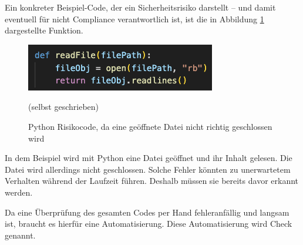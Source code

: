 \documentclass[../main.tex]{subfiles}
\begin{document}
Ein konkreter Beispiel-Code, der ein Sicherheitsrisiko darstellt -- und damit eventuell für nicht Compliance verantwortlich ist, ist die in Abbildung \ref{fig:codecompliance} dargestellte Funktion.

\begin{figure}[ht]
    \centering
    \includegraphics[scale=1]{bilder/CodeScreenShot.png}
    \caption{Python Risikocode, da eine geöffnete Datei nicht richtig geschlossen wird}
    \footnotesize (selbst geschrieben)
    \label{fig:codecompliance}
\end{figure}

In dem Beispiel wird mit Python eine Datei geöffnet und ihr Inhalt gelesen.
Die Datei wird allerdings nicht geschlossen.
Solche Fehler könnten zu unerwartetem Verhalten während der Laufzeit führen.
Deshalb müssen sie bereits davor erkannt werden.

Da eine Überprüfung des gesamten Codes per Hand fehleranfällig und langsam ist, braucht es hierfür eine Automatisierung.
Diese Automatisierung wird Check genannt.
\end{document}
